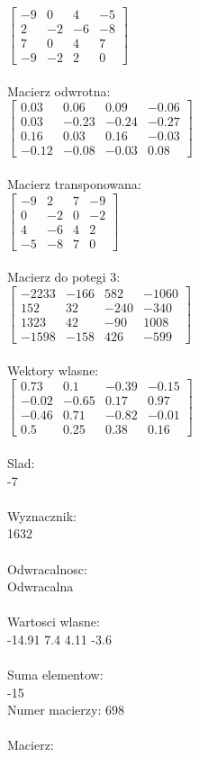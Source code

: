 \documentclass[a4paper,12pt]{article}
\begin{document}
$\begin{bmatrix} -9&0&4&-5\\2&-2&-6&-8\\7&0&4&7\\-9&-2&2&0 \end{bmatrix}$
\\
\\
Macierz odwrotna:\\

$\begin{bmatrix} 0.03&0.06&0.09&-0.06\\0.03&-0.23&-0.24&-0.27\\0.16&0.03&0.16&-0.03\\-0.12&-0.08&-0.03&0.08 \end{bmatrix}$
\\
\\
Macierz transponowana:\\

$\begin{bmatrix} -9&2&7&-9\\0&-2&0&-2\\4&-6&4&2\\-5&-8&7&0 \end{bmatrix}$
\\
\\
Macierz do potegi 3:\\

$\begin{bmatrix} -2233&-166&582&-1060\\152&32&-240&-340\\1323&42&-90&1008\\-1598&-158&426&-599 \end{bmatrix}$
\\
\\
Wektory wlasne:\\

$\begin{bmatrix} 0.73&0.1&-0.39&-0.15\\-0.02&-0.65&0.17&0.97\\-0.46&0.71&-0.82&-0.01\\0.5&0.25&0.38&0.16 \end{bmatrix}$
\\
\\
Slad:\\
-7
\\
\\
Wyznacznik:\\
1632
\\
\\
Odwracalnosc:\\
Odwracalna
\\
\\
Wartosci wlasne:\\
-14.91 7.4 4.11 -3.6
\\
\\
Suma elementow:\\
-15
\\
\newpage
Numer macierzy:
698
\\
\\
Macierz:\\
\end{document}
